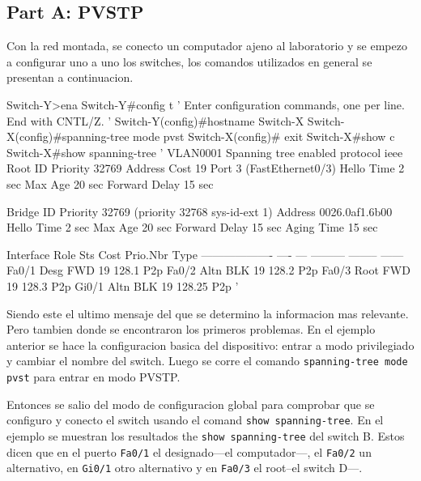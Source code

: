 
\subsection*{Part A: PVSTP}

Con la red montada, se conecto un computador ajeno al laboratorio y se empezo a
configurar uno a uno los switches, los comandos utilizados en general se presentan a 
continuacion.

\begin{darkcode}
Switch-Y>ena
Switch-Y#config t
'
Enter configuration commands, one per line.  End with CNTL/Z.
'
Switch-Y(config)#hostname Switch-X
Switch-X(config)#spanning-tree mode pvst
Switch-X(config)# exit
Switch-X#show c
Switch-X#show spanning-tree 
'
VLAN0001
  Spanning tree enabled protocol ieee
  Root ID    Priority    32769
             Address     \swdA
             Cost        19
             Port        3 (FastEthernet0/3)
             Hello Time   2 sec  Max Age 20 sec  Forward Delay 15 sec

  Bridge ID  Priority    32769  (priority 32768 sys-id-ext 1)
             Address     0026.0af1.6b00
             Hello Time   2 sec  Max Age 20 sec  Forward Delay 15 sec
             Aging Time  15  sec

Interface           Role Sts Cost      Prio.Nbr Type
------------------- ---- --- --------- -------- ------
Fa0/1               Desg FWD 19        128.1    P2p 
Fa0/2               Altn BLK 19        128.2    P2p 
Fa0/3               Root FWD 19        128.3    P2p 
Gi0/1               Altn BLK 19        128.25   P2p 
'
\end{darkcode}

Siendo este el ultimo mensaje del que se determino la informacion mas relevante. Pero
tambien donde se encontraron los primeros problemas. En el ejemplo anterior se hace la
configuracion basica del dispositivo: entrar a modo privilegiado y cambiar el nombre
del switch. Luego se corre el comando \texttt{spanning-tree mode pvst} para entrar en
modo PVSTP.

Entonces se salio del modo de configuracion global para comprobar que se configuro
y conecto el switch usando el comand \texttt{show spanning-tree}. En el ejemplo se
muestran los resultados the \texttt{show spanning-tree} del switch B. Estos dicen que
en el puerto \texttt{Fa0/1} el designado---el computador---, el
\texttt{Fa0/2} un alternativo,  en \texttt{Gi0/1} otro alternativo y en \texttt{Fa0/3}
el root--el switch D---.


